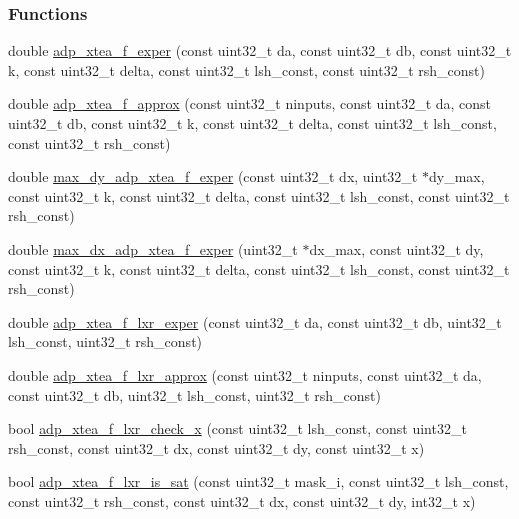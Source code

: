 \subsubsection*{\-Functions}
\begin{DoxyCompactItemize}
\item 
double \hyperlink{adp-xtea-f-fk_8cc_afc8e94b86821e291ee04292462a6b6ed}{adp\-\_\-xtea\-\_\-f\-\_\-exper} (const uint32\-\_\-t da, const uint32\-\_\-t db, const uint32\-\_\-t k, const uint32\-\_\-t delta, const uint32\-\_\-t lsh\-\_\-const, const uint32\-\_\-t rsh\-\_\-const)
\item 
double \hyperlink{adp-xtea-f-fk_8cc_ae945b860edf247413923712da6049e24}{adp\-\_\-xtea\-\_\-f\-\_\-approx} (const uint32\-\_\-t ninputs, const uint32\-\_\-t da, const uint32\-\_\-t db, const uint32\-\_\-t k, const uint32\-\_\-t delta, const uint32\-\_\-t lsh\-\_\-const, const uint32\-\_\-t rsh\-\_\-const)
\item 
double \hyperlink{adp-xtea-f-fk_8cc_adcd285fa82803159c2bd305f3b6af692}{max\-\_\-dy\-\_\-adp\-\_\-xtea\-\_\-f\-\_\-exper} (const uint32\-\_\-t dx, uint32\-\_\-t $\ast$dy\-\_\-max, const uint32\-\_\-t k, const uint32\-\_\-t delta, const uint32\-\_\-t lsh\-\_\-const, const uint32\-\_\-t rsh\-\_\-const)
\item 
double \hyperlink{adp-xtea-f-fk_8cc_adb4dc310e2d779ca1c67def32b9269d0}{max\-\_\-dx\-\_\-adp\-\_\-xtea\-\_\-f\-\_\-exper} (uint32\-\_\-t $\ast$dx\-\_\-max, const uint32\-\_\-t dy, const uint32\-\_\-t k, const uint32\-\_\-t delta, const uint32\-\_\-t lsh\-\_\-const, const uint32\-\_\-t rsh\-\_\-const)
\item 
double \hyperlink{adp-xtea-f-fk_8cc_ac50f3242518f20723245aab340eb792f}{adp\-\_\-xtea\-\_\-f\-\_\-lxr\-\_\-exper} (const uint32\-\_\-t da, const uint32\-\_\-t db, uint32\-\_\-t lsh\-\_\-const, uint32\-\_\-t rsh\-\_\-const)
\item 
double \hyperlink{adp-xtea-f-fk_8cc_a99789dee8eb188999bb10f7562919edb}{adp\-\_\-xtea\-\_\-f\-\_\-lxr\-\_\-approx} (const uint32\-\_\-t ninputs, const uint32\-\_\-t da, const uint32\-\_\-t db, uint32\-\_\-t lsh\-\_\-const, uint32\-\_\-t rsh\-\_\-const)
\item 
bool \hyperlink{adp-xtea-f-fk_8cc_acd7dae800736b30a19b7393823b82c5f}{adp\-\_\-xtea\-\_\-f\-\_\-lxr\-\_\-check\-\_\-x} (const uint32\-\_\-t lsh\-\_\-const, const uint32\-\_\-t rsh\-\_\-const, const uint32\-\_\-t dx, const uint32\-\_\-t dy, const uint32\-\_\-t x)
\item 
bool \hyperlink{adp-xtea-f-fk_8cc_a3f12a9d9fd1ae70e96ed71c6f3961307}{adp\-\_\-xtea\-\_\-f\-\_\-lxr\-\_\-is\-\_\-sat} (const uint32\-\_\-t mask\-\_\-i, const uint32\-\_\-t lsh\-\_\-const, const uint32\-\_\-t rsh\-\_\-const, const uint32\-\_\-t dx, const uint32\-\_\-t dy, int32\-\_\-t x)

\end{DoxyCompactItemize}
